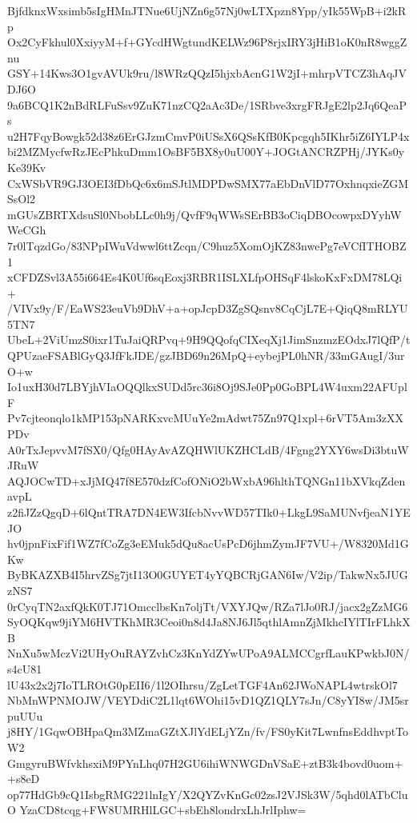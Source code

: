 BjfdknxWxsimb5sIgHMnJTNue6UjNZn6g57Nj0wLTXpzn8Ypp/yIk55WpB+i2kRp
Ox2CyFkhul0XxiyyM+f+GYcdHWgtundKELWz96P8rjxIRY3jHiB1oK0nR8wggZnu
GSY+14Kws3O1gvAVUk9ru/l8WRzQQzI5hjxbAcnG1W2jI+mhrpVTCZ3hAqJVDJ6O
9a6BCQ1K2nBdRLFuSsv9ZuK71nzCQ2aAc3De/1SRbve3xrgFRJgE2lp2Jq6QeaPs
u2H7FqyBowgk52d38z6ErGJzmCmvP0iUSsX6QSsKfB0Kpcgqh5IKhr5iZ6IYLP4x
bi2MZMycfwRzJEcPhkuDmm1OsBF5BX8y0uU00Y+JOGtANCRZPHj/JYKs0yKe39Kv
CxWSbVR9GJ3OEI3fDbQc6x6mSJtlMDPDwSMX77aEbDnVlD77OxhnqxieZGMSsOl2
mGUsZBRTXdsuSl0NbobLLc0h9j/QvfF9qWWsSErBB3oCiqDBOcowpxDYyhWWeCGh
7r0lTqzdGo/83NPpIWuVdwwl6ttZcqn/C9huz5XomOjKZ83nwePg7eVCfITHOBZ1
xCFDZSvl3A55i664Es4K0Uf6sqEoxj3RBR1ISLXLfpOHSqF4lskoKxFxDM78LQi+
/VIVx9y/F/EaWS23euVb9DhV+a+opJcpD3ZgSQsnv8CqCjL7E+QiqQ8mRLYU5TN7
UbeL+2ViUmzS0ixr1TuJaiQRPvq+9H9QQofqCIXeqXj1JimSnzmzEOdxJ7lQfP/t
QPUzaeFSABlGyQ3JfFkJDE/gzJBD69n26MpQ+eybejPL0hNR/33mGAugI/3urO+w
Io1uxH30d7LBYjhVIaOQQlkxSUDd5rc36i8Oj9SJe0Pp0GoBPL4W4uxm22AFUplF
Pv7cjteonqlo1kMP153pNARKxvcMUuYe2mAdwt75Zn97Q1xpl+6rVT5Am3zXXPDv
A0rTxJepvvM7fSX0/Qfg0HAyAvAZQHWlUKZHCLdB/4Fgng2YXY6wsDi3btuWJRuW
AQJOCwTD+xJjMQ47f8E570dzfCofONiO2bWxbA96hlthTQNGn11bXVkqZdenavpL
z2fiJZzQgqD+6lQntTRA7DN4EW3IfcbNvvWD57TIk0+LkgL9SaMUNvfjeaN1YEJO
hv0jpnFixFif1WZ7fCoZg3eEMuk5dQu8acUsPcD6jhmZymJF7VU+/W8320Md1GKw
ByBKAZXB4I5hrvZSg7jtI13O0GUYET4yYQBCRjGAN6Iw/V2ip/TakwNx5JUGzNS7
0rCyqTN2axfQkK0TJ71OmcclbsKn7oljTt/VXYJQw/RZa7lJo0RJ/jacx2gZzMG6
SyOQKqw9jiYM6HVTKhMR3Ceoi0n8d4Ja8NJ6Jl5qthlAmnZjMkhcIYlTIrFLhkXB
NnXu5wMczVi2UHyOuRAYZvhCz3KnYdZYwUPoA9ALMCCgrfLauKPwkbJ0N/s4cU81
lU43x2x2j7IoTLROtG0pEII6/1l2OIhrsu/ZgLetTGF4An62JWoNAPL4wtrskOl7
NbMnWPNMOJW/VEYDdiC2L1lqt6WOhi15vD1QZ1QLY7sJn/C8yYI8w/JM5srpuUUu
j8HY/1GqwOBHpaQm3MZmaGZtXJlYdELjYZn/fv/FS0yKit7LwnfnsEddhvptToW2
GmgyruBWfvkhsxiM9PYnLhq07H2GU6ihiWNWGDnVSaE+ztB3k4bovd0uom++s8eD
op77HdGb9cQ1IsbgRMG221lnIgY/X2QYZvKnGc02zsJ2VJSk3W/5qhd0lATbCluO
YzaCD8tcqg+FW8UMRHlLGC+sbEh8londrxLhJrlIphw=
